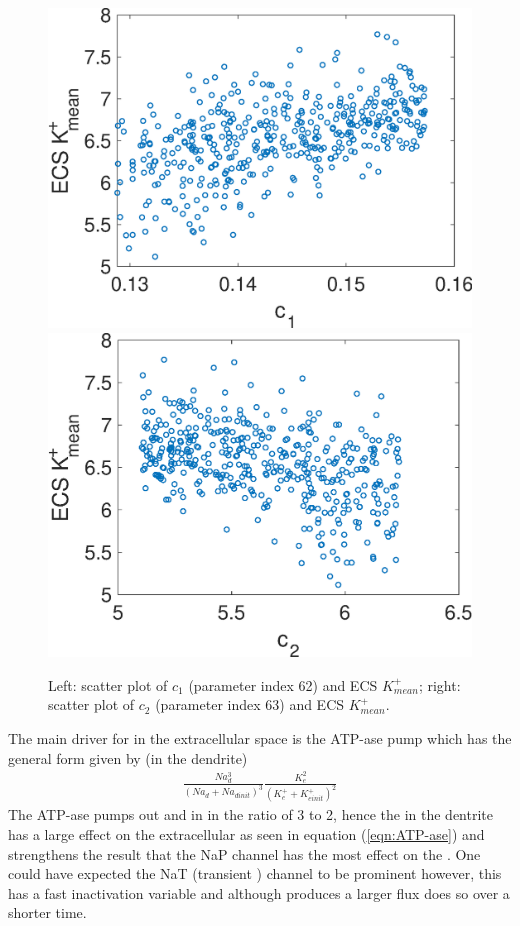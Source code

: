 \begin{figure}
\centering
\includegraphics[width=0.49\linewidth]{Figures/Scatter_62_K_ECS}
\includegraphics[width=0.49\linewidth]{Figures/Scatter_63_K_ECS}
\caption{Left: scatter plot of $c_1$ (parameter index 62) and ECS $K^+_{mean}$; right: scatter plot of $c_2$ (parameter index 63) and ECS $K^+_{mean}$.}
\label{fig:scatter}
\end{figure}
The main driver for \pot in the extracellular space is the \pot \na ATP-ase pump which has the general form given by (in the dendrite)  
\begin{eqnarray}\label{eqn:ATP-ase}
\frac{Na_d^3}{\left( Na_d+Na_{d init}\right)^3}\frac{K^{2}_e}{\left( K^+_e +K^+_{e init}\right) ^2}
\end{eqnarray}
The ATP-ase pumps out \na and in \pot in the ratio of 3 to 2, hence the \na in the dentrite has a large effect on the extracellular \pot as seen in equation (\ref{eqn:ATP-ase}) and strengthens the result that the NaP channel has the most effect on the \pot. One could have expected the NaT (transient \na) channel to be prominent however, this has a fast inactivation variable and although produces a larger flux does so over a shorter time.  
